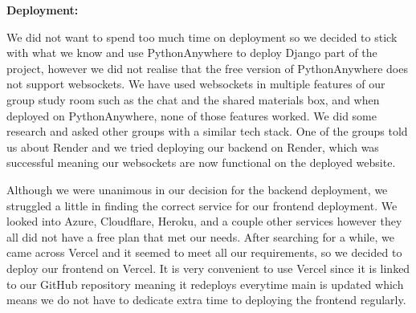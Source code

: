 \textbf{Deployment:}

We did not want to spend too much time on deployment so we decided to stick with what we know and use PythonAnywhere to deploy Django part of the project, however we did not realise that the free version of PythonAnywhere does not support websockets. We have used websockets in multiple features of our group study room such as the chat and the shared materials box, and when deployed on PythonAnywhere, none of those features worked. We did some research and asked other groups with a similar tech stack. One of the groups told us about Render and we tried deploying our backend on Render, which was successful meaning our websockets are now functional on the deployed website.

Although we were unanimous in our decision for the backend deployment, we struggled a little in finding the correct service for our frontend deployment. We looked into Azure, Cloudflare, Heroku, and a couple other services however they all did not have a free plan that met our needs. After searching for a while, we came across Vercel and it seemed to meet all our requirements, so we decided to deploy our frontend on Vercel. It is very convenient to use Vercel since it is linked to our GitHub repository meaning it redeploys everytime main is updated which means we do not have to dedicate extra time to deploying the frontend regularly.
